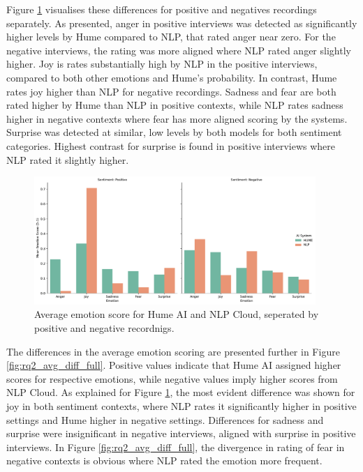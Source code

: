Figure \ref{fig:rq2_sent_grouped_bar} visualises these differences for positive and negatives recordings separately. As presented, anger in positive interviews was detected as significantly higher levels by Hume compared to NLP, 
that rated anger near zero. For the negative interviews, the rating was more aligned where NLP rated anger slightly higher. Joy is rates substantially high by NLP in the positive interviews, compared to both other emotions and Hume’s probability. 
In contrast, Hume rates joy higher than NLP for negative recordings. Sadness and fear are both rated higher by Hume than NLP in positive contexts, while NLP rates sadness higher in negative contexts where fear has more aligned scoring by the systems. 
Surprise was detected at similar, low levels by both models for both sentiment categories. 
Highest contrast for surprise is found in positive interviews where NLP rated it slightly higher.  

\begin{figure}[!h]
    \centering 
    \includegraphics[width=0.95\textwidth]{png/results/rq2/sentiment_comparison_facet_all.pdf}
    \caption{Average emotion score for Hume AI and NLP Cloud, seperated by positive and negative recordnigs.}
    \label{fig:rq2_sent_grouped_bar}
\end{figure}

The differences in the average emotion scoring are presented further in Figure \ref{fig:rq2_avg_diff_full}. Positive values indicate that Hume AI assigned higher scores for respective emotions, while negative values imply higher scores from NLP Cloud. 
As explained for Figure \ref{fig:rq2_sent_grouped_bar}, the most evident difference was shown for joy in both sentiment contexts, where NLP rates it significantly higher in positive settings and Hume higher in negative settings. 
Differences for sadness and surprise were insignificant in negative interviews, aligned with surprise in positive interviews. 
In Figure \ref{fig:rq2_avg_diff_full}, the divergence in rating of fear in negative contexts is obvious where NLP rated the emotion more frequent. 

